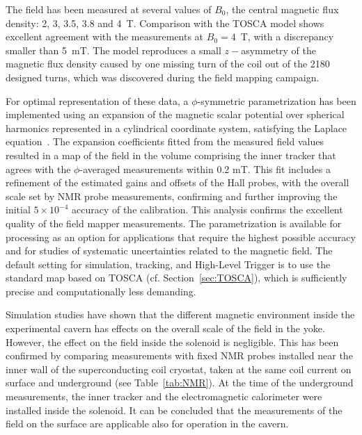 The field has been measured at several values of $B_0$, the central
magnetic flux density: 2, 3, 3.5, 3.8 and 4~T.
Comparison with the TOSCA model
shows excellent agreement with the measurements at
$B_0=4$~T, with a discrepancy smaller than 5~mT.
The model reproduces a small $z-$asymmetry of
the magnetic flux density %
caused by one missing turn of the coil out of the 2180 designed turns,
which was discovered during the field mapping campaign.

For optimal representation of these data, a $\phi$-symmetric parametrization
has been implemented using an expansion of
the magnetic scalar potential over spherical harmonics represented
in a cylindrical coordinate system, satisfying the Laplace
equation~\cite{thesisVassili}.
The expansion coefficients fitted from the measured field values
resulted in a map of the field in the volume comprising the inner tracker
that agrees with the $\phi$-averaged measurements within 0.2 mT.
This fit includes a refinement of the estimated gains and offsets of
the Hall probes, with the overall scale set by NMR probe measurements,
confirming and further improving the initial $5\times10^{-4}$ accuracy
of the calibration.
This analysis confirms the excellent quality of the field mapper measurements.
The parametrization is available for processing as an option for
applications that require the highest possible accuracy and for
studies of systematic uncertainties related to the magnetic field.
The default setting for simulation, tracking, and High-Level Trigger
is to use the standard map based on TOSCA (cf. Section~\ref{sec:TOSCA}),
which is sufficiently precise and computationally less demanding.

Simulation studies have shown that the different magnetic environment inside
the experimental cavern has effects on the overall scale of the
field in the yoke. However, the effect on the field inside the solenoid is
negligible. This has been confirmed by comparing measurements with
fixed NMR probes installed near the inner wall of the superconducting
coil cryostat, taken at the same coil current on surface and
underground (see Table~\ref{tab:NMR}). At the time of the underground
measurements, the inner tracker and the electromagnetic calorimeter
were installed inside the solenoid.
It can be concluded that the measurements of the
field on the surface are applicable also for operation in the cavern.

